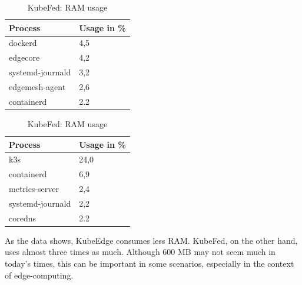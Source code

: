 \documentclass[MIC,Master,english]{twbook}%
\begin{document}
\begin{table}[ht]
    \begin{center}
        \begin{minipage}{.49\linewidth}
            \begin{center}
                \begin{tabular}{|l|l|}
                    \hline
                    Process & Usage in \%  \\
                    \hline
                    dockerd & 4,5 \\
                    edgecore & 4,2 \\
                    systemd-journald & 3,2 \\
                    edgemesh-agent & 2,6 \\
                    containerd & 2.2 \\
                    \hline
                \end{tabular}
                \caption{KubeEdge: RAM usage}
                \label{tab:ke-ram-noload}
            \end{center}
        \end{minipage}
        \begin{minipage}{.49\linewidth}
            \begin{center}
                \begin{tabular}{|l|l|}
                    \hline
                    Process & Usage in \% \\
                    \hline
                    k3s & 24,0 \\
                    containerd & 6,9 \\
                    metrics-server & 2,4 \\
                    systemd-journald & 2,2 \\
                    coredns & 2.2 \\
                    \hline
                \end{tabular}
                \caption{KubeFed: RAM usage}
                \label{tab:kf-ram-noload}
            \end{center}
        \end{minipage}
    \end{center}
\end{table}
As the data shows, KubeEdge consumes less RAM. KubeFed, on the other hand, uses almost three times as much. Although 600 MB may not seem much in today's times, this can be important in some scenarios, especially in the context of edge-computing.
\end{document}
